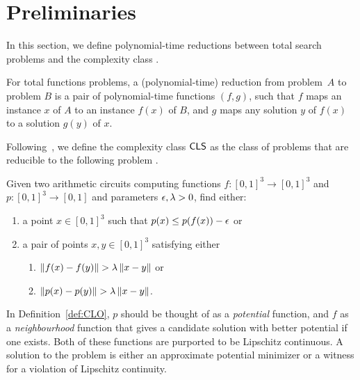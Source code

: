 \section{Preliminaries}


In this section, we define polynomial-time reductions between total search problems
and the complexity class \CLS.
%
\begin{definition}
For total functions problems, a (polynomial-time) reduction from problem~$A$ to
problem $B$ is a pair of polynomial-time functions $(f,g)$, such that $f$ 
maps an instance $x$ of $A$ to an instance $f(x)$ of $B$, and $g$ maps
any solution $y$ of $f(x)$ to a solution $g(y)$ of $x$.
\end{definition}
%
Following~\cite{daskalakis2011continuous}, we define the complexity class $\mathsf{CLS}$
as the class of problems that are reducible to the following problem \CLO.

\begin{definition}
\label{def:CLO}
Given two arithmetic circuits computing functions $f : [0,1]^3\to [0,1]^3$ and $p :
[0,1]^3 \to [0,1]$ and parameters $\epsilon, \lambda > 0$, find either:
\begin{enumerate}[leftmargin=*,label=(C\arabic*)]
\item a point $x\in [0,1]^3$ such that $p(x) \leq p(f(x)) - \epsilon$ or \label{c_fixpoint}
\item a pair of points $x,y\in [0,1]^3$ satisfying either \label{c_violation}
  \begin{enumerate}[label=(C\arabic{enumi}\alph*)] 
  \item $\left\| f(x) - f(y) \right\| > \lambda \left\| x-y \right\|$ or \label{c_bad_f}
  \item $\left\| p(x) - p(y) \right\| > \lambda \left\| x-y \right\|$. \label{c_bad_p}
  \end{enumerate}
\end{enumerate}
\end{definition}

In Definition~\ref{def:CLO}, $p$ should be thought of as a \emph{potential}
function, and $f$ as a \emph{neighbourhood} function that gives a candidate
solution with better potential if one exists. Both of these functions are 
purported to be Lipschitz continuous. A solution to the problem is either an approximate
potential minimizer or a witness for a violation of Lipschitz continuity.

